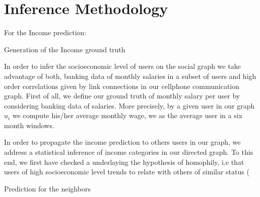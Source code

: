\section{Inference Methodology}





For the Income prediction:

Generation of the Income ground truth

In order to infer the socioeconomic level of users on the social graph we take advantage of both, banking data of monthly salaries in a subset of users and high order correlations given by link connections in our cellphone communication graph. 
First of all, we define our ground truth of monthly salary per user by considering banking data of salaries. More precisely, by a given user in our graph $u_i$ we compute his/her average monthly wage, we as the average user in a six month windows.  

In order to propagate the income prediction to others users in our graph, we address a statistical inference of income categories in our directed graph. To this end, we first have checked a underlaying the hypothesis of homophily, i.e that users of high socioeconomic level trends to relate with others of similar status (


Prediction for the neighbors

